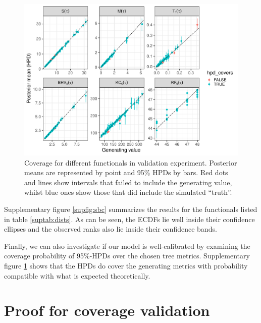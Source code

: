 \documentclass[oneside]{article}
\begin{document}
\begin{figure}
 \includegraphics[width=\textwidth]{../figures/coverage.pdf}
    \caption{Coverage for different functionals in validation experiment.
      Posterior means are represented by point and 95\% HPDs by bars.
      Red dots and lines show intervals that failed to include the
      generating value, whilst blue ones show those that did include
      the simulated ``truth''.}
  \label{supfig:phylo_calibration}
\end{figure}

Supplementary figure \ref{supfig:sbc} summarizes the results for the functionals
listed in table \ref{suptab:dists}.
As can be seen, the ECDFs lie well inside their confidence ellipses
and the observed ranks also lie inside their confidence bands.

Finally, we can also investigate if our model is well-calibrated
by examining the coverage probability of 95\%-HPDs over the chosen
tree metrics.
Supplementary figure \ref{supfig:phylo_calibration} shows that the HPDs do cover the
generating metrics with probability compatible with what is expected
theoretically.

\newpage
\section{Proof for coverage validation}
 \label{appendix::sec:proofs}
\end{document}
